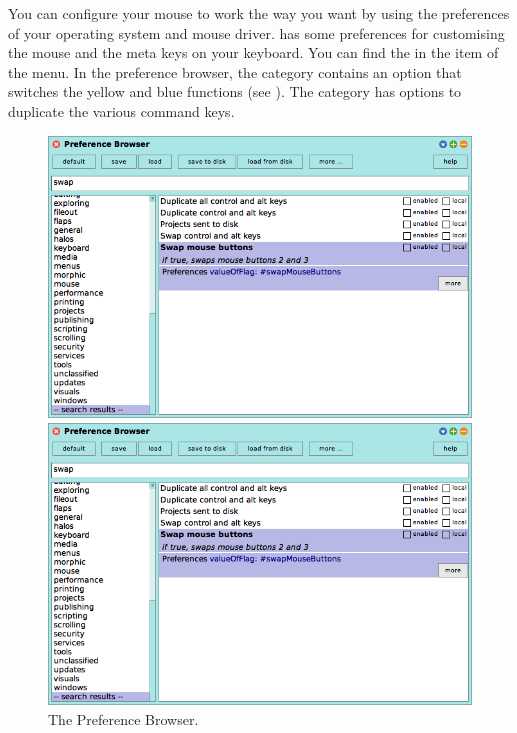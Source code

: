 \documentclass[a4paper,10pt,twoside]{book}
\begin{document}
You can configure your mouse to work the way you want by using the preferences of your operating system and mouse driver.
\sq has some preferences for customising the mouse and the meta keys on your keyboard. You can find the  in the  item of the  menu. 
In the preference browser, the  category contains an option  that switches the yellow and blue functions (see ).  The  category has options to duplicate the various command keys.   



\begin{figure}[htb]
\ifluluelse
	{\centerline {\includegraphics[width=\textwidth]{PreferenceBrowser}}}
	{\centerline {\includegraphics[scale=0.7]{PreferenceBrowser}}}
\caption{The Preference Browser.\label{fig:prefBrowser}}
\end{figure}
\end{document}
